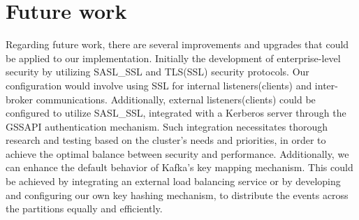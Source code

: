 \section{Future work}

Regarding future work, there are several improvements and upgrades that could be applied to our implementation. Initially the development of enterprise-level security by utilizing SASL\_SSL and TLS(SSL) security protocols. Our configuration would involve using SSL for internal listeners(clients) and inter-broker communications. Additionally, external listeners(clients) could be configured to utilize SASL\_SSL, integrated with a Kerberos server through the GSSAPI authentication mechanism. Such integration necessitates thorough research and testing based on the cluster's needs and priorities, in order to achieve the optimal balance between security and performance. Additionally, we can enhance the default behavior of Kafka's key mapping mechanism. This could be achieved by integrating an external load balancing service or by developing and configuring our own key hashing mechanism, to distribute the events across the partitions equally and efficiently. 